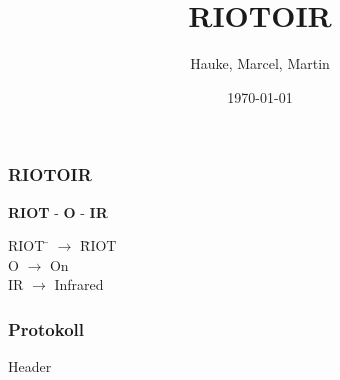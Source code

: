 \documentclass{beamer}
\title{RIOTOIR}
\author{Hauke, Marcel, Martin}
\date{\today}
\begin{document}
	\beamertemplatenavigationsymbolsempty
	\unitlength 5mm

	\maketitle

	\begin{frame} %
		\frametitle{ RIOTOIR } %
		\begin{block}{\textbf{RIOT} - \textbf{O} - \textbf{IR}}
			\begin{tabbing}
				RIOT \= $\rightarrow$ \= RIOT\\
				\break
				O  	 \> $\rightarrow$ \> On\\
				\break
				IR   \> $\rightarrow$ \> Infrared\\
			\end{tabbing}
		\end{block}
	\end{frame}


	\begin{frame} %
		\frametitle{ Protokoll } %
		\begin{block}{Header}
			\vspace{0.5cm}
			\begin{center}
				\begin{bytefield}{24}
					\\
						\\

					\\
					\\
					\skippedwords\\
				\end{bytefield}
			\end{center}
			\vspace{0.3cm}
		\end{block}
	\end{frame}

\end{document}
